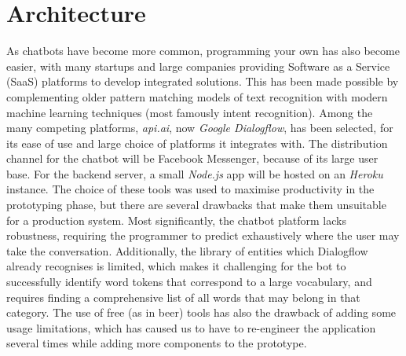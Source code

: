 \documentclass{scrartcl}
\begin{document}
\section*{Architecture}
As chatbots have become more common, programming your own has also become easier, with many startups and large companies providing Software as a Service (SaaS) platforms to develop integrated solutions. This has been made possible by complementing older pattern matching models of text recognition with modern machine learning techniques (most famously intent recognition). Among the many competing platforms, \textit{api.ai}, now \textit{Google Dialogflow}, has been selected, for its ease of use and large choice of platforms it integrates with. The distribution channel for the chatbot will be Facebook Messenger, because of its large user base. For the backend server, a small \textit{Node.js} app will be hosted on an \textit{Heroku} instance. The choice of these tools was used to maximise productivity in the prototyping phase, but there are several drawbacks that make them unsuitable for a production system. Most significantly, the chatbot platform lacks robustness, requiring the programmer to predict exhaustively where the user may take the conversation. Additionally, the library of entities which Dialogflow already recognises is limited, which makes it challenging for the bot to successfully identify word tokens that correspond to a large vocabulary, and requires finding a comprehensive list of all words that may belong in that category. The use of free (as in beer) tools has also the drawback of adding some usage limitations, which has caused us to have to re-engineer the application several times while adding more components to the prototype. \\
\end{document}
